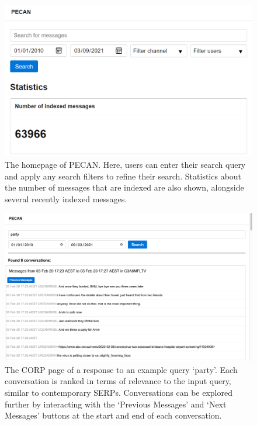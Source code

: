 \begin{figure}
	\includegraphics[width=\linewidth]{homepage}
	\caption{The homepage of PECAN. Here, users can enter their search query and apply any search filters to refine their search. Statistics about the number of messages that are indexed are also shown, alongside several recently indexed messages.}
	\label{fig:homepage}
\end{figure}

\begin{figure}
	\includegraphics[width=\linewidth]{searching}
	\caption{The CORP page of a response to an example query `party'. Each conversation is ranked in terms of relevance to the input query, similar to contemporary SERPs. Conversations can be explored further by interacting with the `Previous Messages' and `Next Messages' buttons at the start and end of each conversation.}
	\label{fig:searching}
\end{figure}

